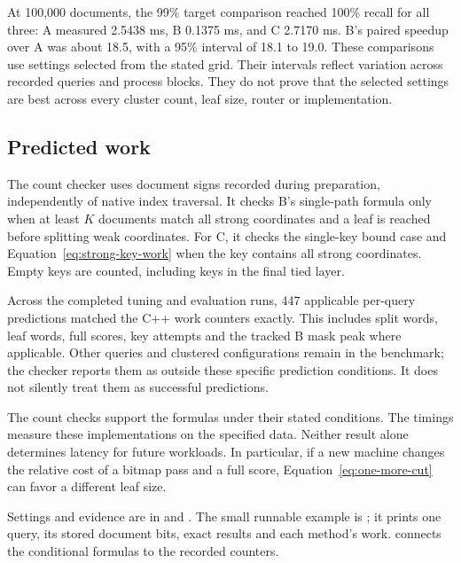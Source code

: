 At 100,000 documents, the 99\% target comparison reached 100\% recall for all three:
A measured 2.5438 ms, B 0.1375 ms, and C 2.7170 ms. B's paired speedup over A was about
18.5, with a 95\% interval of 18.1 to 19.0. These comparisons use settings selected from the stated grid. Their intervals reflect
variation across recorded queries and process blocks. They do not prove that the selected
settings are best across every cluster count, leaf size, router or implementation.


\subsection{Predicted work}
The count checker uses document signs recorded during preparation, independently of native
index traversal. It checks B's single-path formula only when at least $K$ documents match all strong
coordinates and a leaf is reached before splitting weak coordinates. For C, it checks the
single-key bound case and Equation~\eqref{eq:strong-key-work} when the key contains all strong
coordinates. Empty keys are counted, including keys in the final tied layer.

Across the completed tuning and evaluation runs, 447 applicable per-query predictions matched
the C++ work counters exactly. This includes split words, leaf words, full scores, key attempts
and the tracked B mask peak where applicable. Other queries and clustered configurations remain
in the benchmark; the checker reports them as outside these specific prediction conditions.
It does not silently treat them as successful predictions.

The count checks support the formulas under their stated conditions. The timings measure
these implementations on the specified data. Neither result alone determines latency
for future workloads. In particular, if a new
machine changes the relative cost of a bitmap pass and a full score, Equation~\eqref{eq:one-more-cut}
can favor a different leaf size.

{\raggedright
Settings and evidence are in
 and
. The small runnable example is
; it prints one query, its stored document bits, exact results
and each method's work.  connects the conditional formulas
to the recorded counters.
\par}
